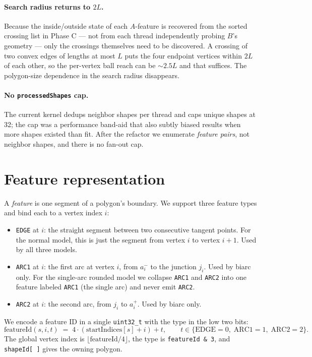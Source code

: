 \documentclass[11pt]{article}
\newcommand{\code}[1]{\texttt{#1}}
\begin{document}
\paragraph{Search radius returns to $2L$.} Because the inside/outside
state of each $A$-feature is recovered from the sorted crossing list
in Phase C --- not from each thread independently probing $B$'s geometry
--- only the crossings themselves need to be discovered. A crossing of
two convex edges of lengths at most $L$ puts the four endpoint vertices
within $2L$ of each other, so the per-vertex ball reach can be
$\sim 2.5L$ and that suffices. The polygon-size dependence in the search
radius disappears.

\paragraph{No \code{processedShapes} cap.} The current kernel dedups
neighbor shapes per thread and caps unique shapes at 32; the cap was a
performance band-aid that also subtly biased results when more shapes
existed than fit. After the refactor we enumerate \emph{feature pairs},
not neighbor shapes, and there is no fan-out cap.

\section{Feature representation}\label{sec:features}

A \emph{feature} is one segment of a polygon's boundary. We support
three feature types and bind each to a vertex index $i$:

\begin{itemize}[leftmargin=*]
  \item \code{EDGE} at $i$: the straight segment between two consecutive
        tangent points. For the normal model, this is just the segment
        from vertex $i$ to vertex $i+1$. Used by all three models.
  \item \code{ARC1} at $i$: the first arc at vertex $i$, from $a_i^-$
        to the junction $j_i$. Used by biarc only. For the single-arc
        rounded model we collapse \code{ARC1} and \code{ARC2} into one
        feature labeled \code{ARC1} (the single arc) and never emit
        \code{ARC2}.
  \item \code{ARC2} at $i$: the second arc, from $j_i$ to $a_i^+$. Used
        by biarc only.
\end{itemize}

We encode a feature ID in a single \code{uint32\_t} with the type in
the low two bits:
\begin{equation*}
  \text{featureId}(s, i, t)
  \;=\; 4 \cdot (\text{startIndices}[s] + i) + t,
  \qquad t \in \{\text{EDGE}=0,\; \text{ARC1}=1,\; \text{ARC2}=2\}.
\end{equation*}
The global vertex index is $\lfloor \text{featureId} / 4 \rfloor$,
the type is \code{featureId \& 3}, and \code{shapeId[\,]} gives the
owning polygon.
\end{document}
